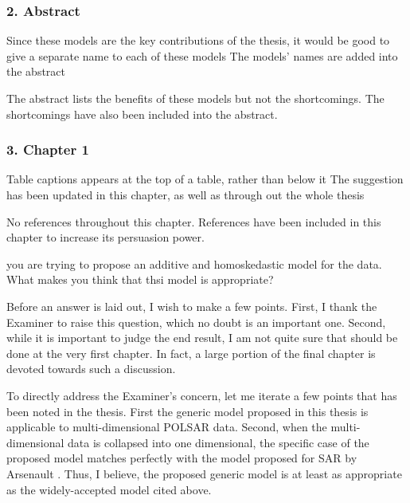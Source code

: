 \subsubsection*{2. Abstract}

\replyToComment
    {Since these models are the key contributions of the thesis, it would be good to give a separate name to each of these models}
    {The models' names are added into the abstract}

\replyToComment
    {The abstract lists the benefits of these models but not the shortcomings.}
    {The shortcomings have also been included into the abstract.}


\subsubsection*{3. Chapter 1}

\replyToComment
    {Table captions appears at the top of a table, rather than below it}
    {The suggestion has been updated in this chapter, as well as through out the whole thesis}

\replyToComment
    {No references throughout this chapter.}
    {References have been included in this chapter to increase its persuasion power.}

\replyToComment
    {you are trying to propose an additive and homoskedastic model for the data. What makes you think that thsi model is appropriate?}
    {Before an answer is laid out, I wish to make a few points.
First, I thank the Examiner to raise this question, which no doubt is an important one. 
Second, while it is important to judge the end result, 
  I am not quite sure that should be done at the very first chapter.
In fact, a large portion of the final chapter is devoted towards such a discussion.

To directly address the Examiner's concern, let me iterate a few points that has been noted in the thesis.
First the generic model proposed in this thesis is applicable to multi-dimensional POLSAR data.
Second, when the multi-dimensional data is collapsed into one dimensional, 
  the specific case of the proposed model matches perfectly with the model proposed for SAR by Arsenault \cite{Arsenault_JOptSocAm_1976}. 
Thus, I believe, the proposed generic model is at least as appropriate as the widely-accepted model cited above.
}

